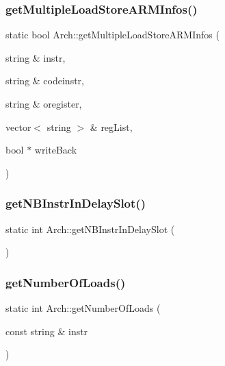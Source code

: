 \mbox{\label{classArch_a2691fdefb6c6b0b7eb488564aa3f8db6}} 
\subsubsection{\texorpdfstring{get\+Multiple\+Load\+Store\+A\+R\+M\+Infos()}{getMultipleLoadStoreARMInfos()}}
{\footnotesize\ttfamily static bool Arch\+::get\+Multiple\+Load\+Store\+A\+R\+M\+Infos (\begin{DoxyParamCaption}\item[{string \&}]{instr,  }\item[{string \&}]{codeinstr,  }\item[{string \&}]{oregister,  }\item[{vector$<$ string $>$ \&}]{reg\+List,  }\item[{bool $\ast$}]{write\+Back }\end{DoxyParamCaption})\hspace{0.3cm}{\ttfamily [static]}}

\mbox{\label{classArch_a2cfdbdf8fe0435d65ce6549c4683fd0c}} 
\subsubsection{\texorpdfstring{get\+N\+B\+Instr\+In\+Delay\+Slot()}{getNBInstrInDelaySlot()}}
{\footnotesize\ttfamily static int Arch\+::get\+N\+B\+Instr\+In\+Delay\+Slot (\begin{DoxyParamCaption}{ }\end{DoxyParamCaption})\hspace{0.3cm}{\ttfamily [static]}}

\mbox{\label{classArch_a3d6b18c0c59e806230a51f42a0373f1f}} 
\subsubsection{\texorpdfstring{get\+Number\+Of\+Loads()}{getNumberOfLoads()}}
{\footnotesize\ttfamily static int Arch\+::get\+Number\+Of\+Loads (\begin{DoxyParamCaption}\item[{const string \&}]{instr }\end{DoxyParamCaption})\hspace{0.3cm}{\ttfamily [static]}}

